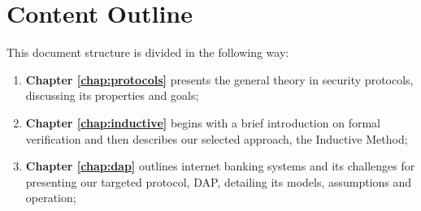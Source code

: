 \section{Content Outline}

This document structure is divided in the following way:

\begin{enumerate}
    \item \textbf{Chapter \ref{chap:protocols}} presents the general theory in security protocols, discussing its properties and goals;

    \item \textbf{Chapter \ref{chap:inductive}} begins with a brief introduction on formal verification and then describes our selected approach, the Inductive Method;

    \item \textbf{Chapter \ref{chap:dap}} outlines internet banking systems and its challenges for presenting our targeted protocol, DAP, detailing its models, assumptions and operation;

\end{enumerate}
